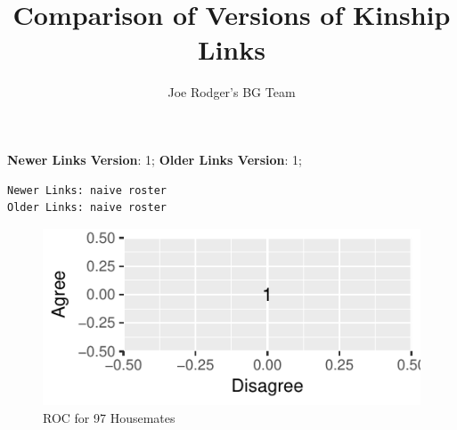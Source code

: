 \documentclass[a4paper]{article}\usepackage[]{graphicx}\usepackage[]{color}
\title{Comparison of Versions of Kinship Links}
\author{Joe Rodger's BG Team}
\makeatletter
\def\maxwidth{ %
  \ifdim\Gin@nat@width>\linewidth
    \linewidth
  \else
    \Gin@nat@width
  \fi
}
\newenvironment{kframe}{%
 \def\at@end@of@kframe{}%
 \ifinner\ifhmode%
  \def\at@end@of@kframe{\end{minipage}}%
  \begin{minipage}{\columnwidth}%
 \fi\fi%
 \def\FrameCommand##1{\hskip\@totalleftmargin \hskip-\fboxsep
 \colorbox{shadecolor}{##1}\hskip-\fboxsep
     \hskip-\linewidth \hskip-\@totalleftmargin \hskip\columnwidth}%
 \MakeFramed {\advance\hsize-\width
   \@totalleftmargin\z@ \linewidth\hsize
   \@setminipage}}%
 {\par\unskip\endMakeFramed%
 \at@end@of@kframe}
\newenvironment{knitrout}{}{} %
\makeatother
\begin{document}
\maketitle

\setlength{\parindent}{0pt}%




















\textbf{Newer Links Version}: 1;
\textbf{Older Links Version}: 1;




\begin{knitrout}
\color{fgcolor}\begin{kframe}
\begin{verbatim}
Newer Links: naive roster
Older Links: naive roster
\end{verbatim}
\end{kframe}
\end{knitrout}

\begin{figure}[htbp]
\begin{knitrout}
\color{fgcolor}
\includegraphics[width=\maxwidth]{figure/unnamed-chunk-2-1} 

\end{knitrout}
\caption{ROC for 97 Housemates}
\end{figure}
\end{document}
